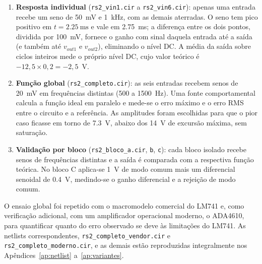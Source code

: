 \begin{enumerate}
  \item \textbf{Resposta individual} (\texttt{rs2\_vin1.cir} a
        \texttt{rs2\_vin6.cir}): apenas uma entrada recebe um seno de
        \SI{50}{\milli\volt} e \SI{1}{\kilo\hertz}, com as demais
        aterradas. O seno tem pico positivo em
        $t=\SI{2.25}{\milli\second}$ e vale em
        \SI{2.75}{\milli\second}; a diferença entre os dois pontos,
        dividida por \SI{100}{\milli\volt}, fornece o ganho com sinal
        daquela entrada até a saída (e também até $v_{out1}$ e
        $v_{out2}$), eliminando o nível DC. A média da saída sobre
        ciclos inteiros mede o próprio nível DC, cujo valor teórico é
        $-12{,}5 \times 0{,}2 = -2{,}5$~V.
  \item \textbf{Função global} (\texttt{rs2\_completo.cir}): as seis
        entradas recebem senos de \SI{20}{\milli\volt} em frequências
        distintas (500 a \SI{1500}{\hertz}). Uma fonte comportamental
        calcula a função ideal em paralelo e mede-se o erro máximo e o
        erro RMS entre o circuito e a referência. As amplitudes foram
        escolhidas para que o pior caso ficasse em torno de
        \SI{7.3}{\volt}, abaixo dos \SI{14}{\volt} de excursão máxima,
        sem saturação.
  \item \textbf{Validação por bloco}
        (\texttt{rs2\_bloco\_a.cir}, \texttt{b}, \texttt{c}): cada
        bloco isolado recebe senos de frequências distintas e a saída é
        comparada com a respectiva função teórica. No bloco C
        aplica-se \SI{1}{\volt} de modo comum mais um diferencial
        senoidal de \SI{0.4}{\volt}, medindo-se o ganho diferencial e a
        rejeição de modo comum.
\end{enumerate}

O ensaio global foi repetido com o macromodelo comercial do LM741 e,
como verificação adicional, com um amplificador operacional moderno, o
ADA4610, para quantificar quanto do erro observado se deve às
limitações do LM741. As netlists correspondentes,
\texttt{rs2\_completo\_vendor.cir} e
\texttt{rs2\_completo\_moderno.cir}, e as demais estão reproduzidas
integralmente nos Apêndices~\ref{ap:netlist}
a~\ref{ap:variantes}.
